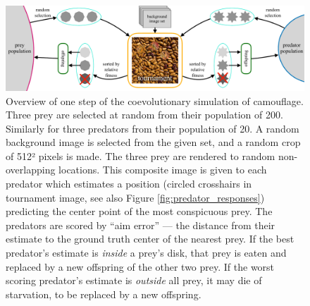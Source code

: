 \documentclass[acmtog]{acmart}
\begin{document}
\begin{figure}
    \includegraphics[width=\textwidth]{images/coc_overview.pdf}
    \caption{Overview of one step of the coevolutionary simulation of camouflage. Three prey are selected at random from their population of 200. Similarly for three predators from their population of 20. A random background image is selected from the given set, and a random crop of 512² pixels is made. The three prey are rendered to random non-overlapping locations. This composite image is given to each predator which estimates a position (circled crosshairs in tournament image, see also Figure \ref{fig:predator_responses}) predicting the center point of the most conspicuous prey. The predators are scored by “aim error” — the distance from their estimate to the ground truth center of the nearest prey. If the best predator's estimate is \textit{inside} a prey's disk, that prey is eaten and replaced by a new offspring of the other two prey. If the worst scoring predator's estimate is \textit{outside} all prey, it may die of starvation, to be replaced by a new offspring.}
    \label{fig:simulation_overview}
\end{figure}

\end{document}
